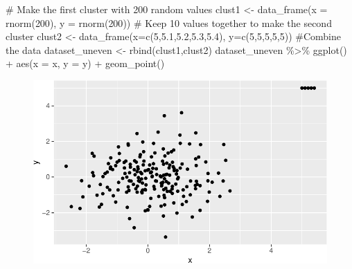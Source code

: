 \documentclass[
  letterpaper,
  DIV=11,
  numbers=noendperiod]{scrreprt}
\newenvironment{Shaded}{\begin{snugshade}}{\end{snugshade}}
\newcommand{\AttributeTok}[1]{\textcolor[rgb]{0.40,0.45,0.13}{#1}}
\newcommand{\CommentTok}[1]{\textcolor[rgb]{0.37,0.37,0.37}{#1}}
\newcommand{\DecValTok}[1]{\textcolor[rgb]{0.68,0.00,0.00}{#1}}
\newcommand{\FloatTok}[1]{\textcolor[rgb]{0.68,0.00,0.00}{#1}}
\newcommand{\FunctionTok}[1]{\textcolor[rgb]{0.28,0.35,0.67}{#1}}
\newcommand{\NormalTok}[1]{\textcolor[rgb]{0.00,0.23,0.31}{#1}}
\newcommand{\OtherTok}[1]{\textcolor[rgb]{0.00,0.23,0.31}{#1}}
\newcommand{\SpecialCharTok}[1]{\textcolor[rgb]{0.37,0.37,0.37}{#1}}
\begin{document}
\begin{Shaded}
\begin{Highlighting}[]
\CommentTok{\# Make the first cluster with 200 random values}
\NormalTok{clust1 }\OtherTok{\textless{}{-}} \FunctionTok{data\_frame}\NormalTok{(}\AttributeTok{x =} \FunctionTok{rnorm}\NormalTok{(}\DecValTok{200}\NormalTok{), }
                     \AttributeTok{y =} \FunctionTok{rnorm}\NormalTok{(}\DecValTok{200}\NormalTok{))}
\CommentTok{\# Keep 10 values together to make the second cluster}
\NormalTok{clust2 }\OtherTok{\textless{}{-}} \FunctionTok{data\_frame}\NormalTok{(}\AttributeTok{x=}\FunctionTok{c}\NormalTok{(}\DecValTok{5}\NormalTok{,}\FloatTok{5.1}\NormalTok{,}\FloatTok{5.2}\NormalTok{,}\FloatTok{5.3}\NormalTok{,}\FloatTok{5.4}\NormalTok{),}
                     \AttributeTok{y=}\FunctionTok{c}\NormalTok{(}\DecValTok{5}\NormalTok{,}\DecValTok{5}\NormalTok{,}\DecValTok{5}\NormalTok{,}\DecValTok{5}\NormalTok{,}\DecValTok{5}\NormalTok{))}
\CommentTok{\#Combine the data}
\NormalTok{dataset\_uneven }\OtherTok{\textless{}{-}} \FunctionTok{rbind}\NormalTok{(clust1,clust2)}
\NormalTok{dataset\_uneven }\SpecialCharTok{\%\textgreater{}\%} \FunctionTok{ggplot}\NormalTok{() }\SpecialCharTok{+} \FunctionTok{aes}\NormalTok{(}\AttributeTok{x =}\NormalTok{ x, }\AttributeTok{y =}\NormalTok{ y) }\SpecialCharTok{+} \FunctionTok{geom\_point}\NormalTok{()}
\end{Highlighting}
\end{Shaded}

\begin{figure}[H]

{\centering \includegraphics{./12-clustering_files/figure-pdf/unnamed-chunk-6-1.pdf}

}

\end{figure}
\end{document}

